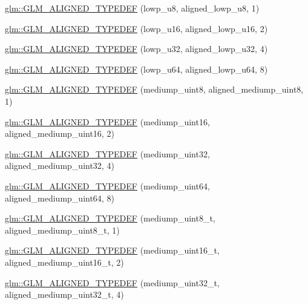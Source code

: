 \begin{DoxyCompactItemize}
\item 
\hyperlink{group__gtx__type__aligned_gad7bb97c29d664bd86ffb1bed4abc5534}{glm\-::\-G\-L\-M\-\_\-\-A\-L\-I\-G\-N\-E\-D\-\_\-\-T\-Y\-P\-E\-D\-E\-F} (lowp\-\_\-u8, aligned\-\_\-lowp\-\_\-u8, 1)
\item 
\hyperlink{group__gtx__type__aligned_ga404bba7785130e0b1384d695a9450b28}{glm\-::\-G\-L\-M\-\_\-\-A\-L\-I\-G\-N\-E\-D\-\_\-\-T\-Y\-P\-E\-D\-E\-F} (lowp\-\_\-u16, aligned\-\_\-lowp\-\_\-u16, 2)
\item 
\hyperlink{group__gtx__type__aligned_ga31ba41fd896257536958ec6080203d2a}{glm\-::\-G\-L\-M\-\_\-\-A\-L\-I\-G\-N\-E\-D\-\_\-\-T\-Y\-P\-E\-D\-E\-F} (lowp\-\_\-u32, aligned\-\_\-lowp\-\_\-u32, 4)
\item 
\hyperlink{group__gtx__type__aligned_gacca5f13627f57b3505676e40a6e43e5e}{glm\-::\-G\-L\-M\-\_\-\-A\-L\-I\-G\-N\-E\-D\-\_\-\-T\-Y\-P\-E\-D\-E\-F} (lowp\-\_\-u64, aligned\-\_\-lowp\-\_\-u64, 8)
\item 
\hyperlink{group__gtx__type__aligned_ga5faf1d3e70bf33174dd7f3d01d5b883b}{glm\-::\-G\-L\-M\-\_\-\-A\-L\-I\-G\-N\-E\-D\-\_\-\-T\-Y\-P\-E\-D\-E\-F} (mediump\-\_\-uint8, aligned\-\_\-mediump\-\_\-uint8, 1)
\item 
\hyperlink{group__gtx__type__aligned_ga727e2bf2c433bb3b0182605860a48363}{glm\-::\-G\-L\-M\-\_\-\-A\-L\-I\-G\-N\-E\-D\-\_\-\-T\-Y\-P\-E\-D\-E\-F} (mediump\-\_\-uint16, aligned\-\_\-mediump\-\_\-uint16, 2)
\item 
\hyperlink{group__gtx__type__aligned_ga12566ca66d5962dadb4a5eb4c74e891e}{glm\-::\-G\-L\-M\-\_\-\-A\-L\-I\-G\-N\-E\-D\-\_\-\-T\-Y\-P\-E\-D\-E\-F} (mediump\-\_\-uint32, aligned\-\_\-mediump\-\_\-uint32, 4)
\item 
\hyperlink{group__gtx__type__aligned_ga7b66a97a8acaa35c5a377b947318c6bc}{glm\-::\-G\-L\-M\-\_\-\-A\-L\-I\-G\-N\-E\-D\-\_\-\-T\-Y\-P\-E\-D\-E\-F} (mediump\-\_\-uint64, aligned\-\_\-mediump\-\_\-uint64, 8)
\item 
\hyperlink{group__gtx__type__aligned_gaa9cde002439b74fa66120a16a9f55fcc}{glm\-::\-G\-L\-M\-\_\-\-A\-L\-I\-G\-N\-E\-D\-\_\-\-T\-Y\-P\-E\-D\-E\-F} (mediump\-\_\-uint8\-\_\-t, aligned\-\_\-mediump\-\_\-uint8\-\_\-t, 1)
\item 
\hyperlink{group__gtx__type__aligned_ga1ca98c67f7d1e975f7c5202f1da1df1f}{glm\-::\-G\-L\-M\-\_\-\-A\-L\-I\-G\-N\-E\-D\-\_\-\-T\-Y\-P\-E\-D\-E\-F} (mediump\-\_\-uint16\-\_\-t, aligned\-\_\-mediump\-\_\-uint16\-\_\-t, 2)
\item 
\hyperlink{group__gtx__type__aligned_ga1dc8bc6199d785f235576948d80a597c}{glm\-::\-G\-L\-M\-\_\-\-A\-L\-I\-G\-N\-E\-D\-\_\-\-T\-Y\-P\-E\-D\-E\-F} (mediump\-\_\-uint32\-\_\-t, aligned\-\_\-mediump\-\_\-uint32\-\_\-t, 4)

\end{DoxyCompactItemize}
